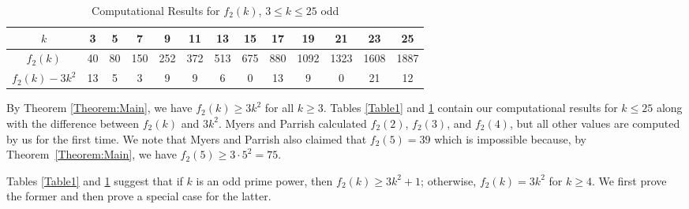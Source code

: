 \documentclass[10pt,a4paper]{amsart}
\begin{document}
\begin{table}[H]
\renewcommand{\arraystretch}{1.5}
\centering
\begin{tabular}{|c|c|c|c|c|c|c|c|c|c|c|c|c|}
\hline
$k$&3&5&7&9&11&13&15&17&19&21&23&25\\\hline
$f_2(k)$&40&80&150&252&372&513&675&880&1092&1323&1608&1887\\\hline
$f_2(k)-3k^2$&13&5&3&9&9&6&0&13&9&0&21&12\\\hline
\end{tabular}
\caption{Computational Results for $f_2(k)$, $3\leq k\leq 25$ odd}\label{Table2}
\end{table}

By Theorem \ref{Theorem:Main}, we have $f_2(k)\geq3k^2$ for all $k\geq3$. Tables \ref{Table1} and \ref{Table2} contain our computational results for $k\leq 25$ along with the difference between $f_2(k)$ and $3k^2$. Myers and Parrish \cite{MyersParrish2018} calculated $f_2(2)$, $f_2(3)$, and $f_2(4)$, but all other values are computed by us for the first time. We note that Myers and Parrish \cite[Computation 21 on Page 12]{MyersParrish2018} also claimed that $f_2(5)=39$ which is impossible because, by Theorem~\ref{Theorem:Main}, we have $f_2(5)\geq3\cdot5^2=75$. 

Tables \ref{Table1} and \ref{Table2} suggest that if $k$ is an odd prime power, then $f_2(k)\geq3k^2+1$; otherwise, $f_2(k)=3k^2$ for $k\geq4$. We first prove the former and then prove a special case for the latter.
\end{document}
